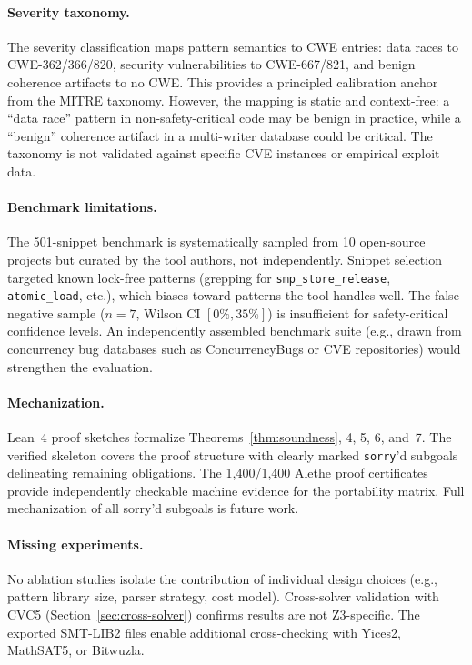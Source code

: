 \documentclass[11pt]{article}
\begin{document}
\paragraph{Severity taxonomy.}
The severity classification maps pattern semantics to CWE entries:
data races to CWE-362/366/820, security vulnerabilities to CWE-667/821,
and benign coherence artifacts to no CWE.
This provides a principled calibration anchor from the MITRE taxonomy.
However, the mapping is static and context-free: a ``data race'' pattern
in non-safety-critical code may be benign in practice, while a ``benign''
coherence artifact in a multi-writer database could be critical.
The taxonomy is not validated against specific CVE instances or
empirical exploit data.

\paragraph{Benchmark limitations.}
The 501-snippet benchmark is systematically sampled from 10 open-source
projects but curated by the tool authors, not independently.
Snippet selection targeted known lock-free patterns (grepping for
\texttt{smp\_store\_release}, \texttt{atomic\_load}, etc.), which
biases toward patterns the tool handles well.
The false-negative sample
($n=7$, Wilson CI $[0\%, 35\%]$) is insufficient for safety-critical
confidence levels. An independently assembled benchmark suite
(e.g., drawn from concurrency bug databases such as ConcurrencyBugs
or CVE repositories) would strengthen the evaluation.

\paragraph{Mechanization.}
Lean~4 proof sketches formalize Theorems~\ref{thm:soundness}, 4, 5, 6,
and~7.  The verified skeleton covers the proof structure with clearly
marked \texttt{sorry}'d subgoals delineating remaining obligations.
The 1{,}400/1{,}400 Alethe proof certificates provide independently
checkable machine evidence for the portability matrix.
Full mechanization of all sorry'd subgoals is future work.

\paragraph{Missing experiments.}
No ablation studies isolate the contribution of individual design
choices (e.g., pattern library size, parser strategy, cost model).
Cross-solver validation with CVC5 (Section~\ref{sec:cross-solver})
confirms results are not Z3-specific.
The exported SMT-LIB2 files enable additional cross-checking with
Yices2, MathSAT5, or Bitwuzla.
\end{document}
